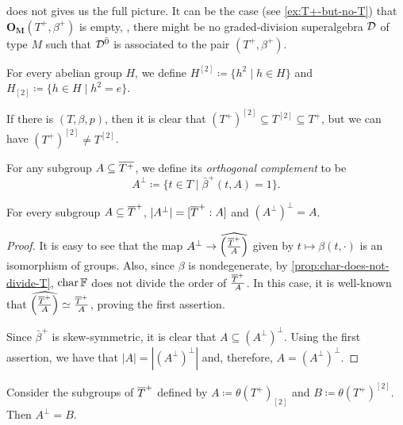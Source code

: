  does not gives us the full picture. 
It can be the case (see \cref{ex:T+-but-no-T}) that $\mathbf{O_M}(T^+, \beta^+)$ is empty, \ie, there might be no graded-division superalgebra $\mathcal{D}$ of type $M$ such that $\mathcal{D}^{\bar0}$ is associated to the pair $(T^+, \beta^+)$.

\begin{defi}
	For every abelian group $H$, we define $H^{[2]} \coloneqq \{h^2 \mid h\in H\}$ and $H_{[2]} \coloneqq \{h\in H \mid h^2 = e \}$.
\end{defi}

If there is $(T, \beta, p)$, then it is clear that $(T^+)^{[2]} \subseteq T^{[2]} \subseteq T^+$, but we can have $(T^+)^{[2]} \neq T^{[2]}$. 

\begin{defi} 
    For any subgroup $A\subseteq \barr{T^+}$, we define its \emph{orthogonal complement} to be
    \[
        A^\perp \coloneqq \{t\in T\mid \bar\beta^+ (t, A) =1\}.
    \]
\end{defi}

\begin{lemma}\label{lemma:perp-perp}
    For every subgroup $A \subseteq \barr T^+$, $|A^\perp| = [\barr T^+ : A]$ and $(A^\perp)^\perp = A$.
\end{lemma}

\begin{proof}
    It is easy to see that the map $A^\perp \to \widehat{\left( \frac{\barr T^+}{A}\right)}$ given by $t \mapsto \beta(t, \cdot)$ is an isomorphism of groups. 
    Also, since $\beta$ is nondegenerate, by \cref{prop:char-does-not-divide-T},  $\operatorname{char} \mathbb{F}$ does not divide the order of $\frac{\barr T^+}{A}$. 
    In this case, it is well-known that $\widehat{\left( \frac{\barr T^+}{A}\right)} \iso \frac{\barr T^+}{A}$, proving the first assertion.

    Since $\bar\beta^+$ is skew-symmetric, it is clear that $A \subseteq (A^\perp)^\perp$. 
    Using the first assertion, we have that $|A| = |(A^\perp)^\perp|$ and, therefore, $A = (A^\perp)^\perp$.
\end{proof}


\begin{prop}\label{prop:small-perp}
    Consider the subgroups of $\barr T^+$ defined by $A \coloneqq \theta(T^+)_{[2]}$ and $B \coloneqq \theta(T^+)^{[2]}$. 
    Then $A^\perp = B$.
\end{prop}


